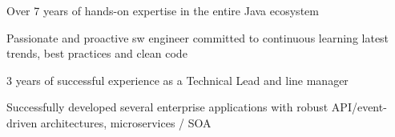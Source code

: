 

\begin{cvparagraph}

\vspace{10pt}
\begin{cvitems} %
        \item {Over 7 years of hands-on expertise in the entire Java ecosystem}
        \item {Passionate and proactive sw engineer committed to continuous learning latest trends, best practices and clean code}
        \item {3 years of successful experience as a Technical Lead and line manager}
        \item {Successfully developed several enterprise applications with robust API/event-driven architectures, microservices / SOA}
      \end{cvitems}
\end{cvparagraph}
